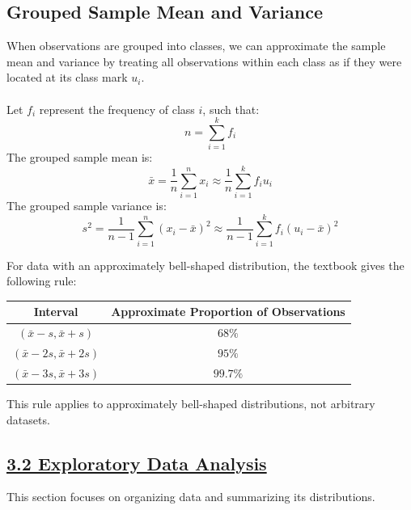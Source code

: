 ﻿\documentclass[12pt]{article}
\begin{document}
\subsection*{Grouped Sample Mean and Variance}
When observations are grouped into classes, we can approximate the sample mean and variance by treating all observations within each class as if they were located at its class mark \(u_i\).\\\\
Let \(f_i\) represent the frequency of class \(i\), such that:
\[
n=\sum_{i=1}^{k}f_i
\]
The grouped sample mean is:
\[
\boxed{\bar{x}=\frac1n\sum_{i=1}^{n}x_i\approx\frac{1}{n}\sum_{i=1}^{k}f_iu_i}
\]
The grouped sample variance is:
\[
\boxed{s^2=\frac1{n-1}\sum_{i=1}^{n}(x_i-\bar{x})^2\approx\frac{1}{n-1}\sum_{i=1}^{k}f_i(u_i-\bar{x})^2}
\]
\begin{notebox}
For data with an approximately bell-shaped distribution, the textbook gives the following rule:

\begin{center}
\renewcommand{\arraystretch}{1.3}
\begin{tabular}{cc}
\hline
\textbf{Interval} & \textbf{Approximate Proportion of Observations} \\
\hline
$(\bar{x}-s,\bar{x}+s)$ & $68\%$ \\
$(\bar{x}-2s,\bar{x}+2s)$ & $95\%$ \\
$(\bar{x}-3s,\bar{x}+3s)$ & $99.7\%$ \\
\hline
\end{tabular}
\end{center}

This rule applies to approximately bell-shaped distributions, not arbitrary datasets.
\end{notebox}
\subsection*{\underline{3.2 Exploratory Data Analysis}}
This section focuses on organizing data and summarizing its distributions.
\end{document}
